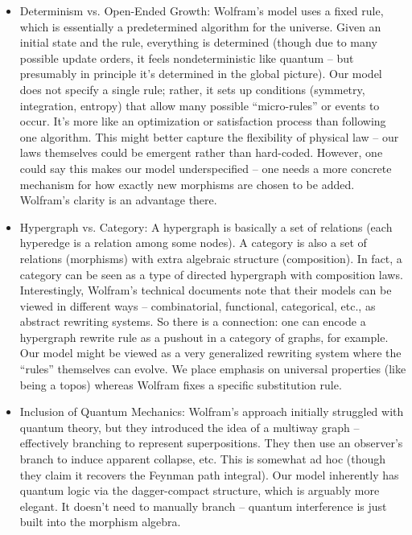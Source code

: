 \documentclass{article}
\begin{document}
\begin{itemize}
\item Determinism vs. Open-Ended Growth: Wolfram’s model uses a fixed rule, which is essentially a predetermined algorithm for the universe. Given an initial state and the rule, everything is determined (though due to many possible update orders, it feels nondeterministic like quantum – but presumably in principle it’s determined in the global picture). Our model does not specify a single rule; rather, it sets up conditions (symmetry, integration, entropy) that allow many possible “micro-rules” or events to occur. It’s more like an optimization or satisfaction process than following one algorithm. This might better capture the flexibility of physical law – our laws themselves could be emergent rather than hard-coded. However, one could say this makes our model underspecified – one needs a more concrete mechanism for how exactly new morphisms are chosen to be added. Wolfram’s clarity is an advantage there.
\item Hypergraph vs. Category: A hypergraph is basically a set of relations (each hyperedge is a relation among some nodes). A category is also a set of relations (morphisms) with extra algebraic structure (composition). In fact, a category can be seen as a type of directed hypergraph with composition laws. Interestingly, Wolfram’s technical documents note that their models can be viewed in different ways – combinatorial, functional, categorical, etc., as abstract rewriting systems\cite{wolfram2020}. So there is a connection: one can encode a hypergraph rewrite rule as a pushout in a category of graphs, for example. Our model might be viewed as a very generalized rewriting system where the “rules” themselves can evolve. We place emphasis on universal properties (like being a topos) whereas Wolfram fixes a specific substitution rule.
\item Inclusion of Quantum Mechanics: Wolfram’s approach initially struggled with quantum theory, but they introduced the idea of a multiway graph – effectively branching to represent superpositions. They then use an observer’s branch to induce apparent collapse, etc. This is somewhat ad hoc (though they claim it recovers the Feynman path integral). Our model inherently has quantum logic via the dagger-compact structure, which is arguably more elegant. It doesn’t need to manually branch – quantum interference is just built into the morphism algebra.

\end{itemize}
\end{document}
